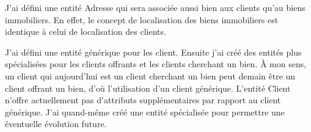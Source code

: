 J'ai défini une entité \og{}Adresse\fg{} qui sera associée aussi bien aux clients qu'au biens immobiliers. En effet, le concept de localisation des biens immobiliers est identique à celui de localisation des clients.

J'ai défini une entité générique pour les client. Ensuite j'ai créé des entités plus spécialisées pour les clients offrants et les clients cherchant un bien. À mon sens, un client qui aujourd'hui est un client cherchant un bien peut demain être un client offrant un bien, d'où l'utilisation d'un client générique. L'entité \og{}Client\fg{} n'offre actuellement pas d'attributs supplémentaires par rapport au client générique. J'ai quand-même créé une entité spécialisée pour permettre une éventuelle évolution future.